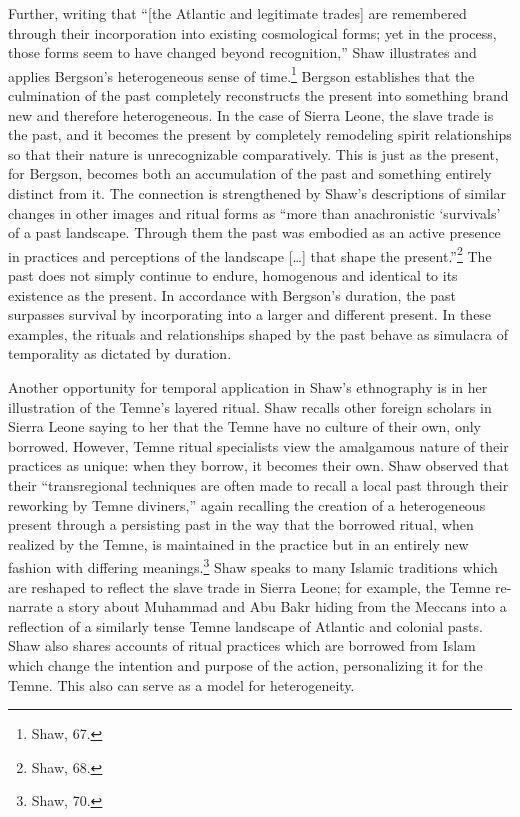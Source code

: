Further, writing that ``{[}the Atlantic and legitimate trades{]} are
remembered through their incorporation into existing cosmological forms;
yet in the process, those forms seem to have changed beyond
recognition,'' Shaw illustrates and applies Bergson's heterogeneous
sense of time.\footnote{Shaw, 67.} Bergson establishes that the
culmination of the past completely reconstructs the present into
something brand new and therefore heterogeneous. In the case of Sierra
Leone, the slave trade is the past, and it becomes the present by
completely remodeling spirit relationships so that their nature is
unrecognizable comparatively. This is just as the present, for Bergson,
becomes both an accumulation of the past and something entirely distinct
from it. The connection is strengthened by Shaw's descriptions of
similar changes in other images and ritual forms as ``more than
anachronistic `survivals' of a past landscape. Through them the past was
embodied as an active presence in practices and perceptions of the
landscape {[}\ldots{]} that shape the present.''\footnote{Shaw, 68.} The
past does not simply continue to endure, homogenous and identical to its
existence as the present. In accordance with Bergson's duration, the
past surpasses survival by incorporating into a larger and different
present. In these examples, the rituals and relationships shaped by the
past behave as simulacra of temporality as dictated by duration.

Another opportunity for temporal application in Shaw's ethnography is in
her illustration of the Temne's layered ritual. Shaw recalls other
foreign scholars in Sierra Leone saying to her that the Temne have no
culture of their own, only borrowed. However, Temne ritual specialists
view the amalgamous nature of their practices as unique: when they
borrow, it becomes their own. Shaw observed that their ``transregional
techniques are often made to recall a local past through their reworking
by Temne diviners,'' again recalling the creation of a heterogeneous
present through a persisting past in the way that the borrowed ritual,
when realized by the Temne, is maintained in the practice but in an
entirely new fashion with differing meanings.\footnote{Shaw, 70.} Shaw
speaks to many Islamic traditions which are reshaped to reflect the
slave trade in Sierra Leone; for example, the Temne re-narrate a story
about Muhammad and Abu Bakr hiding from the Meccans into a reflection of
a similarly tense Temne landscape of Atlantic and colonial pasts. Shaw
also shares accounts of ritual practices which are borrowed from Islam
which change the intention and purpose of the action, personalizing it
for the Temne. This also can serve as a model for heterogeneity.

